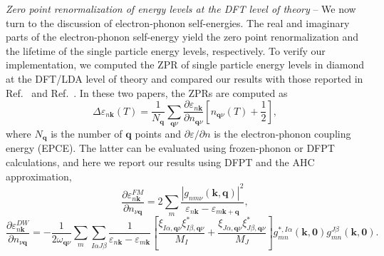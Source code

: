 \documentclass[journal=jctcce,manuscript=article]{achemso}
\newcommand{\bfk}{{\mathbf{k}}}
\newcommand{\bfq}{{\mathbf{q}}}
\begin{document}
{\it Zero point renormalization of energy levels at the DFT level of theory} -- 
We now turn to the discussion of electron-phonon self-energies. The real and imaginary parts of the  electron-phonon self-energy yield the zero point renormalization and the lifetime of the single particle energy levels, respectively. To verify our implementation, we computed the ZPR of single particle energy levels in diamond at the DFT/LDA level of theory and compared our results with those reported in Ref.~ and Ref.~. In these two papers, the ZPRs are computed as 
\begin{equation}
    \Delta\varepsilon_{n\bfk}(T) = \frac{1}{N_\bfq}\sum_{\bfq\nu}\frac{\partial\varepsilon_{n\bfk}}{\partial n_{\bfq\nu}}\left[n_{\bfq\nu}(T)+\frac{1}{2}\right],\label{equ:EPCE}
\end{equation}
where $N_\bfq$ is the number of $\bfq$ points and $\partial\varepsilon/\partial n$ is the electron-phonon coupling energy (EPCE). The latter can be evaluated using frozen-phonon  or DFPT calculations,\cite{ponce2014temperature,monserrat2018electron} and here we report our results using DFPT  and the AHC approximation,\cite{allen1976theory,allen1981theory,ponce2014temperature}
\begin{equation}
    \frac{\partial \varepsilon^{FM}_{n\mathbf{k}}}{\partial n_{\nu\mathbf{q}}}= 2\sum_{m}\frac{\left|g_{nm\nu}(\mathbf{k},\mathbf{q})\right|^2}{\varepsilon_{n\mathbf{k}}-\varepsilon_{m\mathbf{k+q}}},
\end{equation}
\begin{equation}
\frac{\partial \varepsilon^{DW}_{n\mathbf{k}}}{\partial n_{\nu\mathbf{q}}} = -\frac{1}{2\omega_{\mathbf{q}\nu}}\sum_{m}\sum_{I\alpha J\beta}\frac{1}{\varepsilon_{n\mathbf{k}}-\varepsilon_{m\mathbf{k}}}\left[\frac{\xi_{I\alpha,\mathbf{q}\nu}\xi_{I\beta,\mathbf{q}\nu}^*}{M_I} +\frac{\xi_{J\alpha,\mathbf{q}\nu}\xi_{J\beta,\mathbf{q}\nu}^*}{M_J}\right]g^{*,I\alpha}_{mn}(\mathbf{k},\mathbf{0})g^{J\beta}_{mn}(\mathbf{k},\mathbf{0}).
\end{equation}
\end{document}
